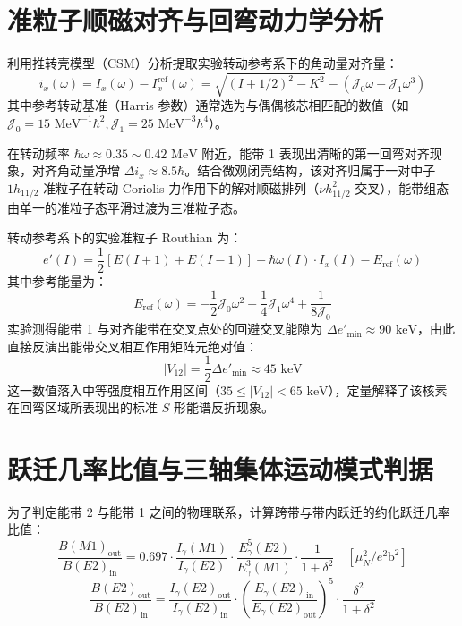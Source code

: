 \section{准粒子顺磁对齐与回弯动力学分析}
\label{sec:case_alignment}

利用推转壳模型（CSM）分析提取实验转动参考系下的角动量对齐量：
\begin{equation}
    i_x(\omega) = I_x(\omega) - I_x^{\text{ref}}(\omega) = \sqrt{(I+1/2)^2 - K^2} - (\mathcal{J}_0 \omega + \mathcal{J}_1 \omega^3)
\end{equation}
其中参考转动基准（Harris 参数）通常选为与偶偶核芯相匹配的数值（如 $\mathcal{J}_0 = 15\text{ MeV}^{-1}\hbar^2, \mathcal{J}_1 = 25\text{ MeV}^{-3}\hbar^4$）。

在转动频率 $\hbar\omega \approx 0.35 \sim 0.42\text{ MeV}$ 附近，能带 1 表现出清晰的第一回弯对齐现象，对齐角动量净增 $\Delta i_x \approx 8.5\hbar$。结合微观闭壳结构，该对齐归属于一对中子 $1h_{11/2}$ 准粒子在转动 Coriolis 力作用下的解对顺磁排列（$\nu h_{11/2}^2$ 交叉），能带组态由单一的准粒子态平滑过渡为三准粒子态。

转动参考系下的实验准粒子 Routhian 为：
\begin{equation}
    e'(I) = \frac{1}{2} \left[ E(I+1) + E(I-1) \right] - \hbar\omega(I) \cdot I_x(I) - E_{\text{ref}}(\omega)
    \label{eq:experimental_routhian}
\end{equation}
其中参考能量为：
\begin{equation}
    E_{\text{ref}}(\omega) = -\frac{1}{2} \mathcal{J}_0 \omega^2 - \frac{1}{4} \mathcal{J}_1 \omega^4 + \frac{1}{8\mathcal{J}_0}
    \label{eq:harris_energy}
\end{equation}
实验测得能带 1 与对齐能带在交叉点处的回避交叉能隙为 $\Delta e'_{\text{min}} \approx 90\text{ keV}$，由此直接反演出能带交叉相互作用矩阵元绝对值：
\begin{equation}
    |V_{12}| = \frac{1}{2} \Delta e'_{\text{min}} \approx 45\text{ keV}
    \label{eq:v12_extracted}
\end{equation}
这一数值落入中等强度相互作用区间（$35 \le |V_{12}| < 65\text{ keV}$），定量解释了该核素在回弯区域所表现出的标准 $S$ 形能谱反折现象。

\section{跃迁几率比值与三轴集体运动模式判据}
\label{sec:case_discussion}

为了判定能带 2 与能带 1 之间的物理联系，计算跨带与带内跃迁的约化跃迁几率比值：
\begin{equation}
    \frac{B(M1)_{\text{out}}}{B(E2)_{\text{in}}} = 0.697 \cdot \frac{I_\gamma(M1)}{I_\gamma(E2)} \cdot \frac{E_\gamma^5(E2)}{E_\gamma^3(M1)} \cdot \frac{1}{1 + \delta^2} \quad [\mu_N^2 / e^2\text{b}^2]
\end{equation}
\begin{equation}
    \frac{B(E2)_{\text{out}}}{B(E2)_{\text{in}}} = \frac{I_\gamma(E2)_{\text{out}}}{I_\gamma(E2)_{\text{in}}} \cdot \left( \frac{E_\gamma(E2)_{\text{in}}}{E_\gamma(E2)_{\text{out}}} \right)^5 \cdot \frac{\delta^2}{1 + \delta^2}
\end{equation}


